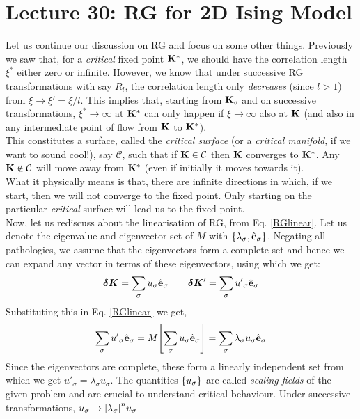 \section*{Lecture 30: RG for 2D Ising Model}
Let us continue our discussion on RG and focus on some other things. Previously we saw that, for a \textit{critical} fixed point $\vb{K}^*$, we should have the correlation length $\xi^*$ either zero or infinite. However, we know that under successive RG transformations with say $R_l$, the correlation length only \textit{decreases} (since $l>1$) from $\xi\to \xi' = \xi/l$. This implies that, starting from $\vb{K}_{\text{\tiny 0}}$ and on successive transformations, $\xi^*\to\infty$ at $\vb{K}^*$ can only happen if $\xi\to \infty$ also at $\vb{K}$ (and also in any intermediate point of flow from $\vb{K}$ to $\vb{K}^*$). \\[0.2cm]
This constitutes a surface, called the \textit{critical surface} (or a \textit{critical manifold}, if we want to sound cool!), say $\mathcal{C}$, such that if $\vb{K}\in \mathcal{C}$ then $\vb{K}$ converges to $\vb{K}^*$. Any $\vb{K}\notin \mathcal{C}$ will move away from $\vb{K}^*$ (even if initially it moves towards it). \\[0.2cm]
What it physically means is that, there are infinite directions in which, if we start, then we will not converge to the fixed point. Only starting on the particular \textit{critical} surface will lead us to the fixed point.\\[0.2cm]
Now, let us rediscuss about the linearisation of RG, from Eq. \eqref{RGlinear}. Let us denote the eigenvalue and eigenvector set of $M$ with $\qty{\lambda_{\sigma}, \hat{\vb{e}}_{\sigma}}$. Negating all pathologies, we assume that the eigenvectors form a complete set and hence we can expand any vector in terms of these eigenvectors, using which we get:
\begin{align}
    \begin{split}
        \boldsymbol{\delta K} = \sum\limits_{\sigma} u_{\sigma}\hat{\vb{e}}_{\sigma} \qquad  \boldsymbol{\delta K}' = \sum\limits_{\sigma} {u'}_{\sigma}\hat{\vb{e}}_{\sigma}
    \end{split}
\end{align}
Substituting this in Eq. \eqref{RGlinear} we get, 
$$\sum\limits_{\sigma} {u'}_{\sigma}\hat{\vb{e}}_{\sigma} = M\qty[\sum\limits_{\sigma} u_{\sigma}\hat{\vb{e}}_{\sigma}] = \sum\limits_{\sigma} \lambda_{\sigma}u_{\sigma}\hat{\vb{e}}_{\sigma}$$
Since the eigenvectors are complete, these form a linearly independent set from which we get ${u'}_{\sigma} = \lambda_{\sigma}u_{\sigma} $. The quantities $\qty{u_{\sigma}}$ are called \textit{scaling fields} of the given problem and are crucial to understand critical behaviour. Under successive transformations, $u_{\sigma}\mapsto \qty[\lambda_{\sigma}]^n u_{\sigma}$\\[0.2cm]
